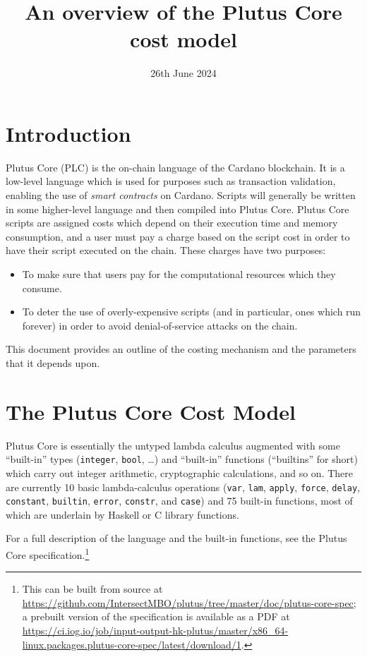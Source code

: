 \documentclass[a4paper]{article}
\title{An overview of the Plutus Core cost model}
\date{26th June 2024}
\begin{document}
\maketitle

\section{Introduction}
Plutus Core (PLC) is the on-chain language of the Cardano blockchain.  It is a
low-level language which is used for purposes such as transaction validation,
enabling the use of \textit{smart contracts} on Cardano.  Scripts will generally
be written in some higher-level language and then compiled into Plutus Core.
Plutus Core scripts are assigned costs which depend on their execution time and
memory consumption, and a user must pay a charge based on the script cost in
order to have their script executed on the chain.  These charges have two
purposes:

\begin{itemize}
\item To make sure that users pay for the computational resources which they consume.
\item To deter the use of overly-expensive scripts (and in particular, ones
  which run forever) in order to avoid denial-of-service attacks on the chain.
\end{itemize}

\noindent This document provides an outline of the costing mechanism and the
parameters that it depends upon.


\section{The Plutus Core Cost Model}
Plutus Core is essentially the untyped lambda calculus augmented with some
``built-in'' types (\texttt{integer}, \texttt{bool}, \ldots) and ``built-in''
functions (``builtins'' for short) which carry out integer arithmetic,
cryptographic calculations, and so on.  There are currently 10 basic
lambda-calculus operations (\texttt{var}, \texttt{lam}, \texttt{apply},
\texttt{force}, \texttt{delay}, \texttt{constant}, \texttt{builtin},
\texttt{error}, \texttt{constr}, and \texttt{case}) and 75 built-in
functions, most of which are underlain by Haskell or C library functions.

For a full description of the language and the built-in functions, see the
Plutus Core specification.\footnote{This can be built from source at
\url{https://github.com/IntersectMBO/plutus/tree/master/doc/plutus-core-spec}; a
prebuilt version of the specification is available as a PDF at
\url{https://ci.iog.io/job/input-output-hk-plutus/master/x86_64-linux.packages.plutus-core-spec/latest/download/1}.}
\end{document}
